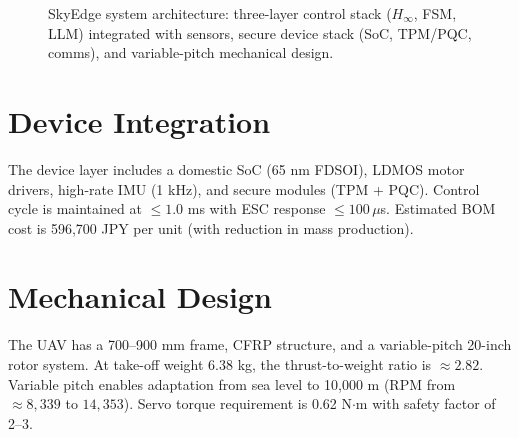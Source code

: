 \documentclass[conference]{IEEEtran}
\begin{document}
\begin{figure}[t]
\caption{SkyEdge system architecture: three-layer control stack ($H_\infty$, FSM, LLM) integrated with sensors, secure device stack (SoC, TPM/PQC, comms), and variable-pitch mechanical design.}
\label{fig:sysarch}
\end{figure}

\section{Device Integration}
The device layer includes a domestic SoC (65 nm FDSOI), LDMOS motor 
drivers, high-rate IMU (1 kHz), and secure modules (TPM + PQC). 
Control cycle is maintained at $\leq 1.0$ ms with ESC response $\leq 100 
\, \mu$s. Estimated BOM cost is 596,700 JPY per unit (with reduction in 
mass production).

\section{Mechanical Design}
The UAV has a 700--900 mm frame, CFRP structure, and a variable-pitch 
20-inch rotor system. At take-off weight 6.38 kg, the thrust-to-weight 
ratio is $\approx 2.82$. Variable pitch enables adaptation from sea 
level to 10,000 m (RPM from $\approx 8,339$ to $14,353$). Servo torque 
requirement is 0.62 N$\cdot$m with safety factor of 2--3.
\end{document}
